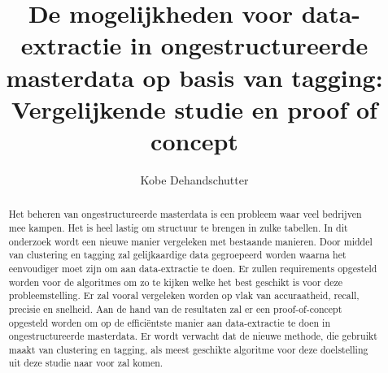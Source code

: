 \documentclass{hogent-article}
\title{De mogelijkheden voor data-extractie in ongestructureerde masterdata op basis van tagging: Vergelijkende studie en proof of concept}
\author{Kobe Dehandschutter}
\begin{document}
\begin{abstract}

  Het beheren van ongestructureerde masterdata is een probleem waar veel bedrijven mee kampen. Het is heel lastig om structuur te brengen in zulke tabellen. In dit onderzoek wordt een nieuwe manier vergeleken met bestaande manieren. Door middel van clustering en tagging zal gelijkaardige data gegroepeerd worden waarna het eenvoudiger moet zijn om aan data-extractie te doen. Er zullen requirements opgesteld worden voor de algoritmes om zo te kijken welke het best geschikt is voor deze probleemstelling. Er zal vooral vergeleken worden op vlak van accuraatheid, recall, precisie en snelheid. Aan de hand van de resultaten zal er een proof-of-concept opgesteld worden om op de efficiëntste manier aan data-extractie te doen in ongestructureerde masterdata. Er wordt verwacht dat de nieuwe methode, die gebruikt maakt van clustering en tagging, als meest geschikte algoritme voor deze doelstelling uit deze studie naar voor zal komen.
\end{abstract}


\tableofcontents


\printbibliography[heading=bibintoc]
\end{document}
